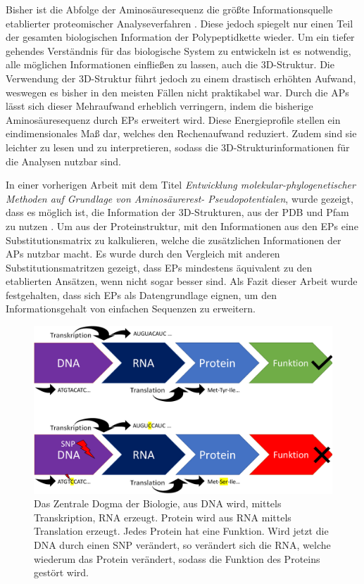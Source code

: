 Bisher ist die Abfolge der Aminosäuresequenz die größte Informationsquelle etablierter proteomischer Analyseverfahren \cite{Landels.2015}. Diese jedoch spiegelt nur einen Teil der gesamten biologischen Information der Polypeptidkette wieder. Um ein tiefer gehendes Verständnis für das biologische System zu entwickeln ist es notwendig, alle möglichen Informationen einfließen zu lassen, auch die 3D-Struktur. Die Verwendung der 3D-Struktur führt jedoch zu einem drastisch erhöhten Aufwand, weswegen es bisher in den meisten Fällen nicht praktikabel war. Durch die \ac{APs} lässt sich dieser Mehraufwand erheblich verringern, indem die bisherige Aminosäuresequenz durch \ac{EP}s erweitert wird. Diese Energieprofile stellen ein eindimensionales Maß dar, welches den Rechenaufwand reduziert. Zudem sind sie leichter zu lesen und zu interpretieren, sodass die 3D-Strukturinformationen für die Analysen nutzbar sind.

In einer vorherigen Arbeit mit dem Titel \emph{Entwicklung mole\-kular-phylo\-genetisch\-er Methoden auf Grundlage von Aminosäurerest- Pseudopotentialen}, wurde gezeigt, dass es möglich ist, die Information der 3D-Strukturen, aus der \ac{PDB} und \ac{Pfam} zu nutzen \cite{Mathias.2014}. Um aus der Proteinstruktur, mit den Informationen aus den EPs eine Substitutionsmatrix zu kalkulieren, welche die zusätzlichen Informationen der \ac{APs} nutzbar macht. Es wurde durch den Vergleich mit anderen Substitutionsmatritzen gezeigt, dass \ac{EP}s mindestens äquivalent zu den etablierten Ansätzen, wenn nicht sogar besser sind. Als Fazit dieser Arbeit wurde festgehalten, dass sich \ac{EP}s als Datengrundlage eignen, um den Informationsgehalt von einfachen Sequenzen zu erweitern.

\begin{figure}
\centering
\includegraphics[width=.95\textwidth]{images/Biologie_dogma.pdf}
\caption{Das Zentrale Dogma der Biologie, aus DNA wird, mittels Transkription, RNA erzeugt. Protein wird aus RNA mittels Translation erzeugt. Jedes Protein hat eine Funktion. Wird jetzt die DNA durch einen \ac{SNP} verändert, so verändert sich die RNA, welche wiederum das Protein verändert, sodass die Funktion des Proteins gestört wird.}
\label{fig:dogma}
\end{figure}



